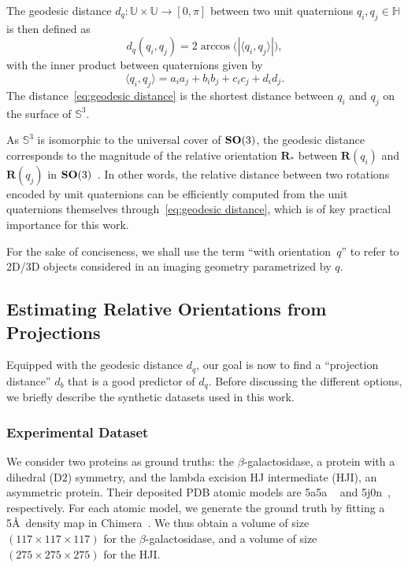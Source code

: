 The geodesic distance $d_q:\mathbb{U}\times\mathbb{U}\rightarrow [0,\pi]$ between two unit quaternions $q_i, q_j\in\mathbb{H}$ is then defined as
\begin{equation}
    \label{eq:geodesic distance}
    d_q(q_i,q_j)=2\arccos\big(|\langle q_i, q_j \rangle|\big),
\end{equation}
with the inner product between quaternions given by
\begin{equation}
    \label{eq:inner-product-quaternions}
    \langle q_i, q_j \rangle = a_ia_j+b_ib_j+c_ic_j+d_id_j.
\end{equation}
The distance~\eqref{eq:geodesic distance} is the shortest distance between $q_i$ and $q_j$ on the surface of $\mathbb{S}^3$.

As $\mathbb{S}^3$ is isomorphic to the universal cover of $\mathrm{\mathbf{SO}}(3)$, the geodesic distance corresponds to the magnitude of the relative orientation $\mathbf{R}_*$ between $\mathbf{R}(q_i)$ and $\mathbf{R}(q_j)$ in $\mathrm{\mathbf{SO}}(3)$~\cite{huynh2009metrics}. In other words, the relative distance between two rotations encoded by unit quaternions can be efficiently computed from the unit quaternions themselves through~\eqref{eq:geodesic distance}, which is of key practical importance for this work.

For the sake of conciseness, we shall use the term ``with orientation~$q$'' to refer to 2D/3D objects considered in an imaging geometry parametrized by $q$.

\subsection{Estimating Relative Orientations from Projections}
\label{sec:estimating-relative-orientations}

Equipped with the geodesic distance $d_q$, our goal is now to find a ``projection distance'' $d_b$ that is a good predictor of $d_q$. Before discussing the different options, we briefly describe the synthetic datasets used in this work.

\subsubsection{Experimental Dataset}
\label{subsec:datasets}

We consider two proteins as ground truths: the $\beta$-galactosidase, a protein with a dihedral (D2) symmetry, and the lambda excision HJ intermediate (HJI), an asymmetric protein. Their deposited PDB atomic models are 5a5a ~\cite{bartesaghi2015betagal} and 5j0n~\cite{laxmikanthan2016structure}, respectively. For each atomic model, we generate the ground truth by fitting a 5\AA\ density map in Chimera~\cite{pettersen2004ucsf}. We thus obtain a volume of size $(117\times 117\times 117)$ for the $\beta$-galactosidase, and a volume of size $(275\times 275\times 275)$ for the HJI.

